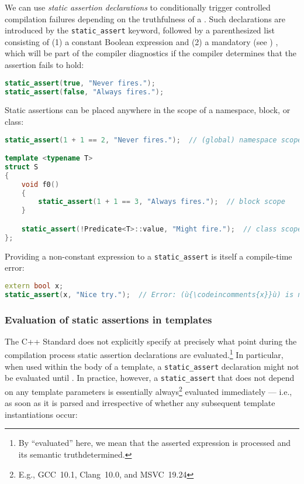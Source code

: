 We can use \emph{static assertion declarations} to conditionally trigger
controlled compilation failures depending on the truthfulness of a
. Such declarations are introduced by the
\lstinline!static_assert! keyword, followed by a parenthesized list
consisting of (1) a constant Boolean expression and (2) a mandatory (see
)
, which will be
part of the compiler diagnostics if the compiler determines that the
assertion fails to hold:

\begin{lstlisting}[language=C++]
static_assert(true, "Never fires.");
static_assert(false, "Always fires.");
\end{lstlisting}

\noindent Static assertions can be placed anywhere in the scope of a namespace,
block, or class:

\begin{lstlisting}[language=C++]
static_assert(1 + 1 == 2, "Never fires.");  // (global) namespace scope

template <typename T>
struct S
{
    void f0()
    {
        static_assert(1 + 1 == 3, "Always fires.");  // block scope
    }

    static_assert(!Predicate<T>::value, "Might fire.");  // class scope
};
\end{lstlisting}

\noindent Providing a non-constant expression to a \lstinline!static_assert! is
itself a compile-time error:

\begin{lstlisting}[language=C++]
extern bool x;
static_assert(x, "Nice try.");  // Error: (ù{\codeincomments{x}}ù) is not a compile-time constant.
\end{lstlisting}


\subsubsection[Evaluation of static assertions in templates]{Evaluation of static assertions in templates}\label{evaluation-of-static-assertions-in-templates}

The C++ Standard does not explicitly specify at precisely what point during
the compilation process static assertion declarations are
evaluated.{\cprotect\footnote{By ``evaluated'' here, we mean that the
  asserted expression is processed and its semantic truth\linebreak[4] determined.}}
In particular, when used within the body of a template, a
\lstinline!static_assert! declaration might not be evaluated until
. In practice, however, a
\lstinline!static_assert! that does not depend on any template parameters
is essentially always{\cprotect\footnote{E.g.,
GCC~10.1, Clang~10.0, and MSVC~19.24}} evaluated immediately --- i.e., as
soon as it is parsed and irrespective of whether any subsequent template
instantiations occur:


